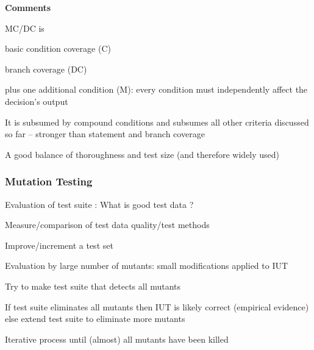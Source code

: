 \textbf{Comments}
\begin{itemize*}
\item MC/DC is
\begin{itemize*}
\item basic condition coverage (C)
\item branch coverage (DC)
\item plus one additional condition (M): every condition must independently affect the decision's output
\end{itemize*}
\item It is subsumed by compound conditions and subsumes all other criteria discussed so far
– stronger than statement and branch coverage
\item A good balance of thoroughness and test size
(and therefore widely used)
\end{itemize*}

\subsubsection{Mutation Testing}
\begin{itemize*}
\item Evaluation of test suite : What is good test data ?
\item Measure/comparison of test data quality/test methods
\item Improve/increment a test set
\item Evaluation by large number of mutants: small modifications applied to IUT
\item Try to make test suite that detects all mutants
\item If test suite eliminates all mutants then IUT is likely correct (empirical evidence) else extend test suite to eliminate more mutants
\item Iterative process until (almost) all mutants have been killed
\end{itemize*}


